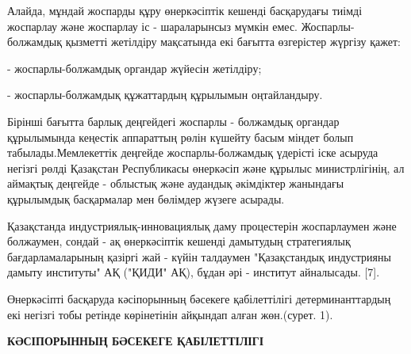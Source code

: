 Алайда, мұндай жоспарды құру өнеркәсіптік кешенді басқарудағы тиімді
жоспарлау және жоспарлау іс - шараларынсыз мүмкін емес.
Жоспарлы-болжамдық қызметті жетілдіру мақсатында екі бағытта өзгерістер
жүргізу қажет:

- жоспарлы-болжамдық органдар жүйесін жетілдіру;

- жоспарлы-болжамдық құжаттардың құрылымын оңтайландыру.

Бірінші бағытта барлық деңгейдегі жоспарлы - болжамдық органдар
құрылымында кеңестік аппараттың рөлін күшейту басым міндет болып
табылады.Мемлекеттік деңгейде жоспарлы-болжамдық үдерісті іске асыруда
негізгі рөлді Қазақстан Республикасы өнеркәсіп және құрылыс
министрлігінің, ал аймақтық деңгейде - облыстық және аудандық әкімдіктер
жанындағы құрылымдық басқармалар мен бөлімдер жүзеге асырады.

Қазақстанда индустриялық-инновациялық даму процестерін жоспарлаумен және
болжаумен, сондай - ақ өнеркәсіптік кешенді дамытудың стратегиялық
бағдарламаларының қазіргі жай - күйін талдаумен "Қазақстандық
индустрияны дамыту институты" АҚ ("ҚИДИ" АҚ), бұдан әрі - институт
айналысады. {[}7{]}.

Өнеркәсіпті басқаруда кәсіпорынның бәсекеге қабілеттілігі
детерминанттардың екі негізгі тобы ретінде көрінетінін айқындап алған
жөн.(сурет. 1).

{\bfseries КӘСІПОРЫННЫҢ БӘСЕКЕГЕ ҚАБІЛЕТТІЛІГІ}

